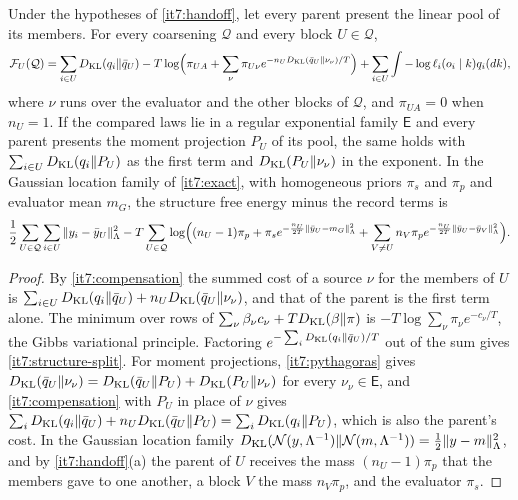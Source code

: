 \documentclass[11pt,letterpaper]{report}
\begin{document}
Under the hypotheses of \cref{it7:handoff}, let every parent present the linear pool of its members. For every coarsening $\mathcal Q$ and every block $U\in\mathcal Q$,
\begin{equation}
\mathcal F_U(\mathcal Q)=\sum_{i\in U}D_{\mathrm{KL}}(q_i\Vert\bar q_U)-T\log\Bigl(\pi_{UA}+\sum_\nu\pi_{U\nu}e^{-n_UD_{\mathrm{KL}}(\bar q_U\Vert\nu_\nu)/T}\Bigr)+\sum_{i\in U}\int-\log\ell_i(o_i\mid k)q_i(dk),
\label{it7:structure-split}
\end{equation}
where $\nu$ runs over the evaluator and the other blocks of $\mathcal Q$, and $\pi_{UA}=0$ when $n_U=1$. If the compared laws lie in a regular exponential family $\mathsf E$ and every parent presents the moment projection $P_U$ of its pool, the same holds with $\sum_{i\in U}D_{\mathrm{KL}}(q_i\Vert P_U)$ as the first term and $D_{\mathrm{KL}}(P_U\Vert\nu_\nu)$ in the exponent. In the Gaussian location family of \cref{it7:exact}, with homogeneous priors $\pi_s$ and $\pi_p$ and evaluator mean $m_G$, the structure free energy minus the record terms is
\begin{equation}
\frac12\sum_{U\in\mathcal Q}\sum_{i\in U}\Vert y_i-\bar y_U\Vert_\Lambda^2-T\sum_{U\in\mathcal Q}\log\Bigl((n_U-1)\pi_p+\pi_se^{-\frac{n_U}{2T}\Vert\bar y_U-m_G\Vert_\Lambda^2}+\sum_{V\ne U}n_V\pi_pe^{-\frac{n_U}{2T}\Vert\bar y_U-\bar y_V\Vert_\Lambda^2}\Bigr).
\label{it7:structure-gauss}
\end{equation}
\begin{proof}
By \cref{it7:compensation} the summed cost of a source $\nu$ for the members of $U$ is $\sum_{i\in U}D_{\mathrm{KL}}(q_i\Vert\bar q_U)+n_UD_{\mathrm{KL}}(\bar q_U\Vert\nu_\nu)$, and that of the parent is the first term alone. The minimum over rows of $\sum_\nu\beta_\nu c_\nu+TD_{\mathrm{KL}}(\beta\Vert\pi)$ is $-T\log\sum_\nu\pi_\nu e^{-c_\nu/T}$, the Gibbs variational principle. Factoring $e^{-\sum_iD_{\mathrm{KL}}(q_i\Vert\bar q_U)/T}$ out of the sum gives \cref{it7:structure-split}. For moment projections, \cref{it7:pythagoras} gives $D_{\mathrm{KL}}(\bar q_U\Vert\nu_\nu)=D_{\mathrm{KL}}(\bar q_U\Vert P_U)+D_{\mathrm{KL}}(P_U\Vert\nu_\nu)$ for every $\nu_\nu\in\mathsf E$, and \cref{it7:compensation} with $P_U$ in place of $\nu$ gives $\sum_iD_{\mathrm{KL}}(q_i\Vert\bar q_U)+n_UD_{\mathrm{KL}}(\bar q_U\Vert P_U)=\sum_iD_{\mathrm{KL}}(q_i\Vert P_U)$, which is also the parent's cost. In the Gaussian location family $D_{\mathrm{KL}}(\mathcal N(y,\Lambda^{-1})\Vert\mathcal N(m,\Lambda^{-1}))=\frac12\Vert y-m\Vert_\Lambda^2$, and by \cref{it7:handoff}(a) the parent of $U$ receives the mass $(n_U-1)\pi_p$ that the members gave to one another, a block $V$ the mass $n_V\pi_p$, and the evaluator $\pi_s$.
\end{proof}
\end{document}
